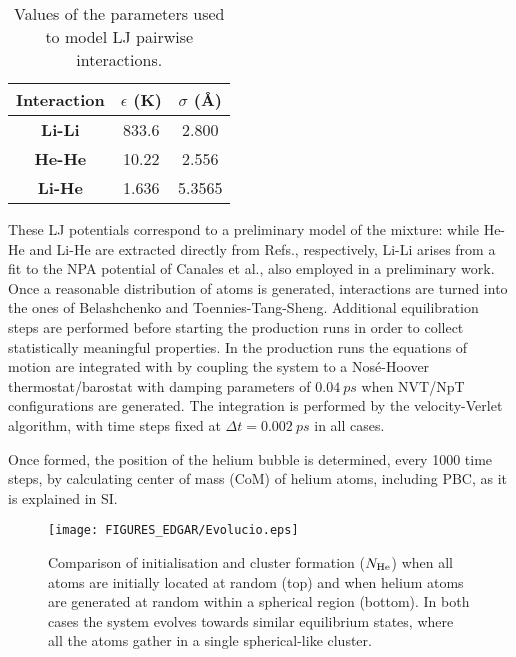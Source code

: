\documentclass[jcp,amsmath,amssymb,preprint]{revtex4-1}
\begin{document}
\begin{table}
            \begin{tabular}{c|c c }
                \toprule
                Interaction & $\epsilon$ (K) &  $\sigma$ (\AA) \\ \hline \hline
                \textbf{Li-Li}\cite{canales1994computer,marti2022nucleation} &  833.6 & 2.800 \\\hline
                \textbf{He-He}\cite{de1938contribution,aziz1987new} & 10.22 & 2.556 \\ \hline
                \textbf{Li-He}\cite{dehmer1972absolute,fraile2020volume} & 1.636 & 5.3565 \\
                \hline \hline
            \end{tabular}
            \caption{Values of the parameters used to model LJ pairwise interactions.}
            \label{tab_LJ}
\end{table}

These LJ potentials correspond to a preliminary model of the mixture: while He-He and Li-He are extracted directly from Refs.\cite{aziz1987new,dehmer1972absolute}, respectively, Li-Li arises from a fit to the NPA potential of Canales et al.\cite{canales1994computer}, also employed in a preliminary work\cite{marti2022nucleation}.  Once a reasonable distribution of 
atoms is generated, interactions are turned into the ones of Belashchenko\cite{belashchenko2012embedded} and 
Toennies-Tang-Sheng\cite{sheng2020conformal,sheng2021development}.  Additional equilibration steps are performed 
before starting the production runs in order to collect statistically meaningful properties.  In the production runs
the equations of motion are integrated with by coupling the system to a Nosé-Hoover thermostat/barostat with 
damping parameters of $\SI{0.04}{ps}$ when NVT/NpT configurations are generated.  The integration is performed by the 
velocity-Verlet\cite{swope1982computer} algorithm, with time steps fixed at $\Delta t = \SI{0.002}{ps}$ in all cases.

Once formed, the position of the helium bubble is determined, every 1000 time steps, by calculating center of mass (CoM) of helium atoms,  including PBC,  as it is explained in SI.

\begin{figure}[htbp]
            \begin{center}
                \texttt{[image: FIGURES\_EDGAR/Evolucio.eps]}
                \caption{Comparison of initialisation and cluster formation ($N_{\rm He}$) when all atoms are initially located at random (top) and when helium atoms are generated at random within a spherical region (bottom). In both cases the system evolves towards similar equilibrium states, where all the atoms gather in a single spherical-like cluster.}
                \label{fig:evol}
            \end{center}
\end{figure} 
  
\end{document}
